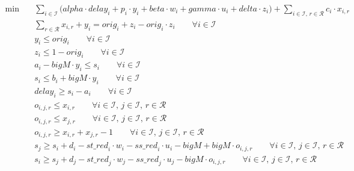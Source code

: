 \begin{align}
  \min\quad & \sum_{i \in \mathcal{I}} \big( \mathit{alpha} \cdot \mathit{delay}_{i} + \mathit{p}_{i} \cdot \mathit{y}_{i} + \mathit{beta} \cdot \mathit{w}_{i} + \mathit{gamma} \cdot \mathit{u}_{i} + \mathit{delta} \cdot \mathit{z}_{i} \big) + \sum_{i \in \mathcal{I},\, r \in \mathcal{R}} \mathit{c}_{i} \cdot \mathit{x}_{i,r} \tag{total\_cost} \\
  & \sum_{r \in \mathcal{R}} \mathit{x}_{i,r} + \mathit{y}_{i} = \mathit{orig}_{i} + \mathit{z}_{i} - \mathit{orig}_{i} \cdot \mathit{z}_{i} \qquad \forall i \in \mathcal{I} \tag{assign\_cancel} \\
  & \mathit{y}_{i} \le \mathit{orig}_{i} \qquad \forall i \in \mathcal{I} \tag{cancel\_link} \\
  & \mathit{z}_{i} \le 1 - \mathit{orig}_{i} \qquad \forall i \in \mathcal{I} \tag{extra\_link} \\
  & \mathit{a}_{i} - \mathit{bigM} \cdot \mathit{y}_{i} \le \mathit{s}_{i} \qquad \forall i \in \mathcal{I} \tag{time\_low} \\
  & \mathit{s}_{i} \le \mathit{b}_{i} + \mathit{bigM} \cdot \mathit{y}_{i} \qquad \forall i \in \mathcal{I} \tag{time\_up} \\
  & \mathit{delay}_{i} \ge \mathit{s}_{i} - \mathit{a}_{i} \qquad \forall i \in \mathcal{I} \tag{delay\_def} \\
  & \mathit{o}_{i,j,r} \le \mathit{x}_{i,r} \qquad \forall i \in \mathcal{I},\, j \in \mathcal{I},\, r \in \mathcal{R} \tag{order\_link1} \\
  & \mathit{o}_{i,j,r} \le \mathit{x}_{j,r} \qquad \forall i \in \mathcal{I},\, j \in \mathcal{I},\, r \in \mathcal{R} \tag{order\_link2} \\
  & \mathit{o}_{i,j,r} \ge \mathit{x}_{i,r} + \mathit{x}_{j,r} - 1 \qquad \forall i \in \mathcal{I},\, j \in \mathcal{I},\, r \in \mathcal{R} \tag{order\_link3} \\
  & \mathit{s}_{j} \ge \mathit{s}_{i} + \mathit{d}_{i} - \mathit{st\_red}_{i} \cdot \mathit{w}_{i} - \mathit{ss\_red}_{i} \cdot \mathit{u}_{i} - \mathit{bigM} + \mathit{bigM} \cdot \mathit{o}_{i,j,r} \qquad \forall i \in \mathcal{I},\, j \in \mathcal{I},\, r \in \mathcal{R} \tag{precede1} \\
  & \mathit{s}_{i} \ge \mathit{s}_{j} + \mathit{d}_{j} - \mathit{st\_red}_{j} \cdot \mathit{w}_{j} - \mathit{ss\_red}_{j} \cdot \mathit{u}_{j} - \mathit{bigM} \cdot \mathit{o}_{i,j,r} \qquad \forall i \in \mathcal{I},\, j \in \mathcal{I},\, r \in \mathcal{R} \tag{precede2}
\end{align}